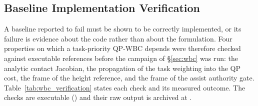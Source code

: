 \documentclass[conference]{IEEEtran}
\begin{document}
\subsection{Baseline Implementation Verification}
\label{sec:wbc_verification_sec}

A baseline reported to fail must be shown to be correctly implemented, or its
failure is evidence about the code rather than about the formulation. Four
properties on which a task-priority QP-WBC depends were therefore checked
against executable references before the campaign of \S\ref{sec:wbc} was run:
the analytic contact Jacobian, the propagation of the task weighting into the QP
cost, the frame of the height reference, and the frame of the assist authority
gate. Table~\ref{tab:wbc_verification} states each check and its measured
outcome. The checks are executable
() and their raw output is archived at
.
\end{document}
